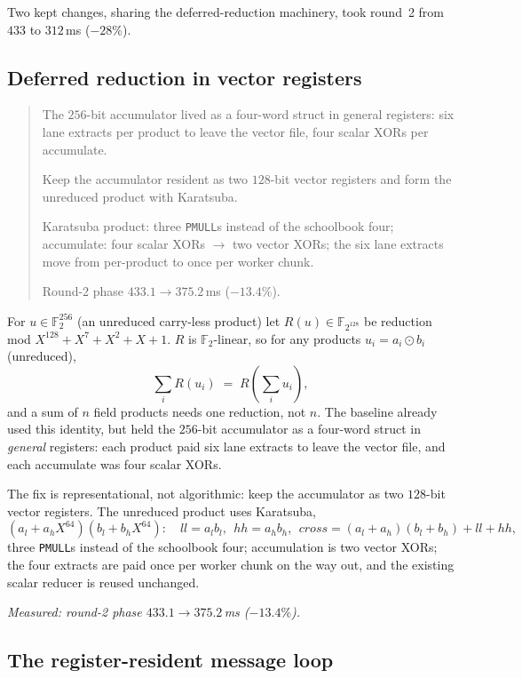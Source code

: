 \documentclass[11pt]{article}
\newcommand{\Ftwo}{\mathbb{F}_2}
\newcommand{\Fbig}{\mathbb{F}_{2^{128}}}
\newcommand{\code}[1]{\texttt{#1}}
\newenvironment{optsummary}{%
  \begin{quote}\small
  \begin{description}
  \setlength{\itemsep}{1pt}\setlength{\parsep}{0pt}\setlength{\topsep}{2pt}
}{%
  \end{description}
  \end{quote}
}
\begin{document}
Two kept changes, sharing the deferred-reduction machinery, took round~2 from
$433$ to $312$\,ms ($-28\%$).

\subsection{Deferred reduction in vector registers}\label{sec:wideneon}

\begin{optsummary}
\item[Baseline:] The $256$-bit accumulator lived as a four-word struct in general registers: six lane extracts per product to leave the vector file, four scalar XORs per accumulate.
\item[Improvement:] Keep the accumulator resident as two $128$-bit vector registers and form the unreduced product with Karatsuba.
\item[Mechanism:] Karatsuba product: three \code{PMULL}s instead of the schoolbook four; accumulate: four scalar XORs $\to$ two vector XORs; the six lane extracts move from per-product to once per worker chunk.
\item[Result:] Round-2 phase $433.1\to375.2\,$ms ($-13.4\%$).
\end{optsummary}

For $u\in\Ftwo^{256}$ (an unreduced carry-less product) let
$R(u)\in\Fbig$ be reduction mod $X^{128}+X^7+X^2+X+1$. $R$ is
$\Ftwo$-linear, so for any products $u_i = a_i \odot b_i$ (unreduced),
\[
\textstyle\sum_i R(u_i) \;=\; R\!\left(\sum_i u_i\right),
\]
and a sum of $n$ field products needs one reduction, not $n$. The baseline
already used this identity, but held the $256$-bit accumulator as a four-word
struct in \emph{general} registers: each product paid six lane extracts to
leave the vector file, and each accumulate was four scalar XORs.

The fix is representational, not algorithmic: keep the accumulator as two
$128$-bit vector registers. The unreduced product uses Karatsuba,
\[
(a_l + a_h X^{64})(b_l + b_h X^{64}) : \quad
\mathit{ll}=a_l b_l,\ \ \mathit{hh}=a_h b_h,\ \
\mathit{cross}=(a_l{+}a_h)(b_l{+}b_h)+\mathit{ll}+\mathit{hh},
\]
three \code{PMULL}s instead of the schoolbook four; accumulation is two vector
XORs; the four extracts are paid once per worker chunk on the way out, and the
existing scalar reducer is reused unchanged.

\emph{Measured: round-2 phase $433.1\to375.2\,$ms ($-13.4\%$).}

\subsection{The register-resident message loop}\label{sec:qres}
\end{document}
